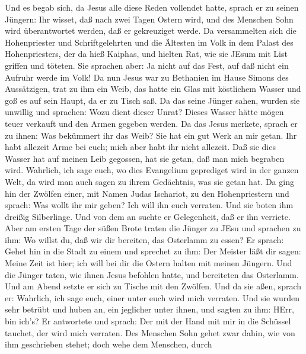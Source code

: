  Und es begab sich, da Jesus alle diese Reden vollendet
hatte, sprach er zu seinen Jüngern:  Ihr wisset, daß nach
zwei Tagen Ostern wird, und des Menschen Sohn wird überantwortet werden,
daß er gekreuziget werde.  Da versammelten sich die
Hohenpriester und Schriftgelehrten und die Ältesten im Volk in dem
Palast des Hohenpriesters, der da hieß Kaiphas,  und hielten
Rat, wie sie JEsum mit List griffen und töteten.  Sie
sprachen aber: Ja nicht auf das Fest, auf daß nicht ein Aufruhr werde im
Volk!  Da nun Jesus war zu Bethanien im Hause Simons des
Aussätzigen,  trat zu ihm ein Weib, das hatte ein Glas mit
köstlichem Wasser und goß es auf sein Haupt, da er zu Tisch saß.
 Da das seine Jünger sahen, wurden sie unwillig und
sprachen: Wozu dient dieser Unrat?  Dieses Wasser hätte
mögen teuer verkauft und den Armen gegeben werden.  Da das
Jesus merkete, sprach er zu ihnen: Was bekümmert ihr das Weib? Sie hat
ein gut Werk an mir getan.  Ihr habt allezeit Arme bei
euch; mich aber habt ihr nicht allezeit.  Daß sie dies
Wasser hat auf meinen Leib gegossen, hat sie getan, daß man mich
begraben wird.  Wahrlich, ich sage euch, wo dies Evangelium
geprediget wird in der ganzen Welt, da wird man auch sagen zu ihrem
Gedächtnis, was sie getan hat.  Da ging hin der Zwölfen
einer, mit Namen Judas Ischariot, zu den Hohenpriestern 
und sprach: Was wollt ihr mir geben? Ich will ihn euch verraten. Und sie
boten ihm dreißig Silberlinge.  Und von dem an suchte er
Gelegenheit, daß er ihn verriete.  Aber am ersten Tage der
süßen Brote traten die Jünger zu JEsu und sprachen zu ihm: Wo willst du,
daß wir dir bereiten, das Osterlamm zu essen?  Er sprach:
Gehet hin in die Stadt zu einem und sprechet zu ihm: Der Meister läßt
dir sagen: Meine Zeit ist hier; ich will bei dir die Ostern halten mit
meinen Jüngern.  Und die Jünger taten, wie ihnen Jesus
befohlen hatte, und bereiteten das Osterlamm.  Und am Abend
setzte er sich zu Tische mit den Zwölfen.  Und da sie aßen,
sprach er: Wahrlich, ich sage euch, einer unter euch wird mich verraten.
 Und sie wurden sehr betrübt und huben an, ein jeglicher
unter ihnen, und sagten zu ihm: HErr, bin ich's?  Er
antwortete und sprach: Der mit der Hand mit mir in die Schüssel tauchet,
der wird mich verraten.  Des Menschen Sohn gehet zwar
dahin, wie von ihm geschrieben stehet; doch wehe dem Menschen, durch
